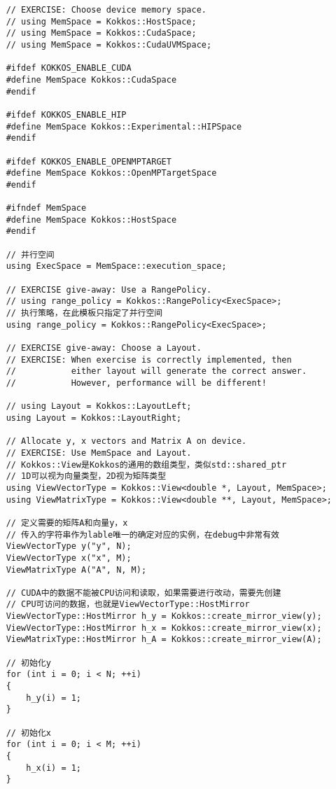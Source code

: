 \begin{lstlisting}
    // EXERCISE: Choose device memory space.
    // using MemSpace = Kokkos::HostSpace;
    // using MemSpace = Kokkos::CudaSpace;
    // using MemSpace = Kokkos::CudaUVMSpace;

    #ifdef KOKKOS_ENABLE_CUDA
    #define MemSpace Kokkos::CudaSpace
    #endif

    #ifdef KOKKOS_ENABLE_HIP
    #define MemSpace Kokkos::Experimental::HIPSpace
    #endif

    #ifdef KOKKOS_ENABLE_OPENMPTARGET
    #define MemSpace Kokkos::OpenMPTargetSpace
    #endif

    #ifndef MemSpace
    #define MemSpace Kokkos::HostSpace
    #endif

    // 并行空间
    using ExecSpace = MemSpace::execution_space;
    
    // EXERCISE give-away: Use a RangePolicy.
    // using range_policy = Kokkos::RangePolicy<ExecSpace>;
    // 执行策略，在此模板只指定了并行空间
    using range_policy = Kokkos::RangePolicy<ExecSpace>;

    // EXERCISE give-away: Choose a Layout.
    // EXERCISE: When exercise is correctly implemented, then
    //           either layout will generate the correct answer.
    //           However, performance will be different!

    // using Layout = Kokkos::LayoutLeft;
    using Layout = Kokkos::LayoutRight;

    // Allocate y, x vectors and Matrix A on device.
    // EXERCISE: Use MemSpace and Layout.
    // Kokkos::View是Kokkos的通用的数组类型，类似std::shared_ptr
    // 1D可以视为向量类型，2D视为矩阵类型
    using ViewVectorType = Kokkos::View<double *, Layout, MemSpace>;
    using ViewMatrixType = Kokkos::View<double **, Layout, MemSpace>;

    // 定义需要的矩阵A和向量y，x
    // 传入的字符串作为lable唯一的确定对应的实例，在debug中非常有效
    ViewVectorType y("y", N);
    ViewVectorType x("x", M);
    ViewMatrixType A("A", N, M);

    // CUDA中的数据不能被CPU访问和读取，如果需要进行改动，需要先创建
    // CPU可访问的数据，也就是ViewVectorType::HostMirror
    ViewVectorType::HostMirror h_y = Kokkos::create_mirror_view(y);
    ViewVectorType::HostMirror h_x = Kokkos::create_mirror_view(x);
    ViewMatrixType::HostMirror h_A = Kokkos::create_mirror_view(A);
    
    // 初始化y 
    for (int i = 0; i < N; ++i)
    {
        h_y(i) = 1;
    }

    // 初始化x 
    for (int i = 0; i < M; ++i)
    {
        h_x(i) = 1;
    }


\end{lstlisting}
